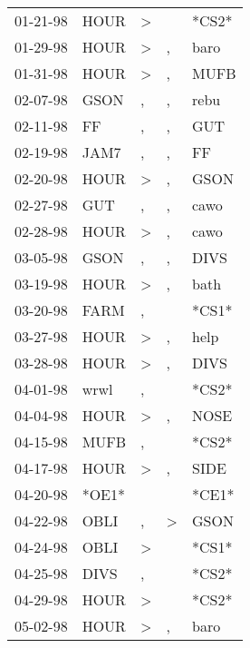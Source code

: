 \begin{supertabular}{lllll}
 01-21-98 &   HOUR &     \textgreater &                  &  *CS2* \\
 01-29-98 &   HOUR &     \textgreater &                , &   baro \\
 01-31-98 &   HOUR &     \textgreater &                , &   MUFB \\
 02-07-98 &   GSON &                , &                , &   rebu \\
 02-11-98 &     FF &                , &                , &    GUT \\
 02-19-98 &   JAM7 &                , &                , &     FF \\
 02-20-98 &   HOUR &     \textgreater &                , &   GSON \\
 02-27-98 &    GUT &                , &                , &   cawo \\
 02-28-98 &   HOUR &     \textgreater &                , &   cawo \\
 03-05-98 &   GSON &                , &                , &   DIVS \\
 03-19-98 &   HOUR &     \textgreater &                , &   bath \\
 03-20-98 &   FARM &                , &                  &  *CS1* \\
 03-27-98 &   HOUR &     \textgreater &                , &   help \\
 03-28-98 &   HOUR &     \textgreater &                , &   DIVS \\
 04-01-98 &   wrwl &                , &                  &  *CS2* \\
 04-04-98 &   HOUR &     \textgreater &                , &   NOSE \\
 04-15-98 &   MUFB &                , &                  &  *CS2* \\
 04-17-98 &   HOUR &     \textgreater &                , &   SIDE \\
 04-20-98 &  *OE1* &                  &                  &  *CE1* \\
 04-22-98 &   OBLI &                , &     \textgreater &   GSON \\
 04-24-98 &   OBLI &     \textgreater &                  &  *CS1* \\
 04-25-98 &   DIVS &                , &                  &  *CS2* \\
 04-29-98 &   HOUR &     \textgreater &                  &  *CS2* \\
 05-02-98 &   HOUR &     \textgreater &                , &   baro \\

\end{supertabular}
